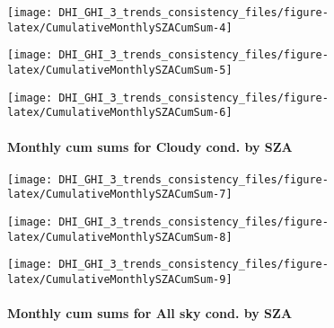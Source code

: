 \documentclass[
  10pt,
  a4paper,oneside]{article}
\begin{document}
\begin{center}\texttt{[image: DHI\_GHI\_3\_trends\_consistency\_files/figure-latex/CumulativeMonthlySZACumSum-4]} \end{center}

\begin{center}\texttt{[image: DHI\_GHI\_3\_trends\_consistency\_files/figure-latex/CumulativeMonthlySZACumSum-5]} \end{center}

\begin{center}\texttt{[image: DHI\_GHI\_3\_trends\_consistency\_files/figure-latex/CumulativeMonthlySZACumSum-6]} \end{center}

\newpage

\FloatBarrier

\hypertarget{monthly-cum-sums-for-cloudy-cond.-by-sza}{%
\paragraph{Monthly cum sums for Cloudy cond. by SZA}\label{monthly-cum-sums-for-cloudy-cond.-by-sza}}

\begin{center}\texttt{[image: DHI\_GHI\_3\_trends\_consistency\_files/figure-latex/CumulativeMonthlySZACumSum-7]} \end{center}

\begin{center}\texttt{[image: DHI\_GHI\_3\_trends\_consistency\_files/figure-latex/CumulativeMonthlySZACumSum-8]} \end{center}

\begin{center}\texttt{[image: DHI\_GHI\_3\_trends\_consistency\_files/figure-latex/CumulativeMonthlySZACumSum-9]} \end{center}

\newpage

\FloatBarrier

\hypertarget{monthly-cum-sums-for-all-sky-cond.-by-sza-1}{%
\paragraph{Monthly cum sums for All sky cond. by SZA}\label{monthly-cum-sums-for-all-sky-cond.-by-sza-1}}

\newpage

\FloatBarrier
\end{document}
